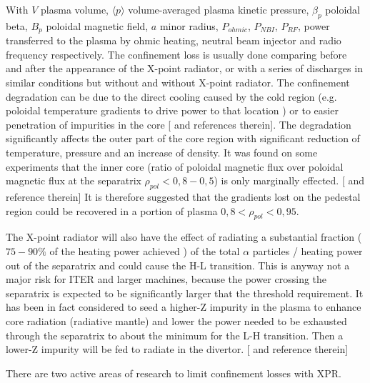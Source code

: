 With $V$ plasma volume, $\langle p \rangle$ volume-averaged plasma kinetic pressure, ${{ \beta }_{ p }}$ poloidal beta, $B_p$ poloidal magnetic field, $a$ minor radius, $P_{ohmic}$, $P_{NBI}$, $P_{RF}$, power transferred to the plasma by ohmic heating, neutral beam injector and radio frequency respectively. \cite{SalarElahi2010,Fallis2013} The confinement loss is usually done comparing before and after the appearance of the X-point radiator, or with a series of discharges in similar conditions but without and without X-point radiator.
The confinement degradation can be due to the direct cooling caused by the cold region (e.g. poloidal temperature gradients to drive power to that location \cite{Lipschultz1998} ) or to easier penetration of impurities in the core [\cite{Lipschultz2016} and references therein]. The degradation significantly affects the outer part of the core region with significant reduction of temperature, pressure and an increase of density. \cite{Kallenbach2015a}  It was found on some experiments that the inner core (ratio of poloidal magnetic flux over poloidal magnetic flux at the separatrix $ \rho _{pol}<0,8-0,5 $) is only marginally effected. [\cite{Reinke2013} and reference therein] It is therefore suggested that the gradients lost on the pedestal region could be recovered in a portion of plasma $0,8< \rho _{pol}<0,95$. \cite{Reimold2015}

The X-point radiator will also have the effect of radiating a substantial fraction ($75-90\%$ of the heating power achieved \cite{Bernert2017}) of the total $ \alpha $ particles / heating power out of the separatrix and could cause the H-L transition. This is anyway not a major risk for ITER and larger machines, because the power crossing the separatrix is expected to be significantly larger that the threshold requirement. It has been in fact considered to seed a higher-Z impurity in the plasma to enhance core radiation (radiative mantle) and lower the power needed to be exhausted through the separatrix to about the minimum for the L-H transition. Then a lower-Z impurity will be fed to radiate in the divertor. [\cite{Kallenbach2015a,Reinke2013} and reference therein]


There are two active areas of research to limit confinement losses with XPR.

